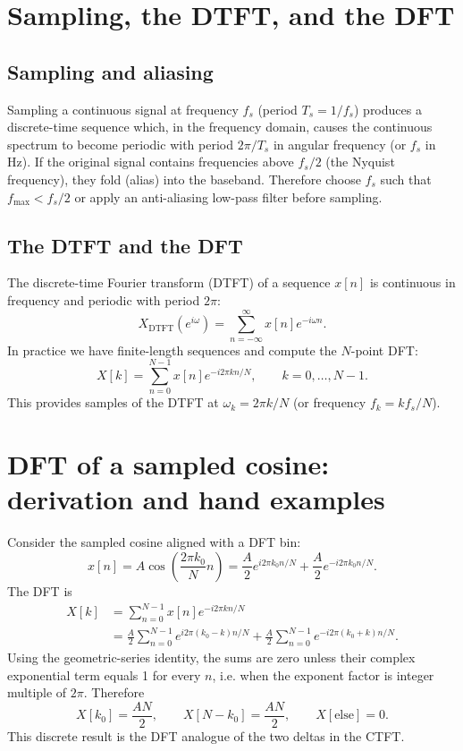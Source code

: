 \documentclass[a4paper]{article}
\begin{document}
\section{Sampling, the DTFT, and the DFT}
\subsection{Sampling and aliasing}
Sampling a continuous signal at frequency $f_s$ (period $T_s=1/f_s$) produces a discrete-time sequence which, in the frequency domain, causes the continuous spectrum to become periodic with period $2\pi/T_s$ in angular frequency (or $f_s$ in Hz). If the original signal contains frequencies above $f_s/2$ (the Nyquist frequency), they fold (alias) into the baseband. Therefore choose $f_s$ such that $f_{\max}<f_s/2$ or apply an anti-aliasing low-pass filter before sampling.

\subsection{The DTFT and the DFT}
The discrete-time Fourier transform (DTFT) of a sequence $x[n]$ is continuous in frequency and periodic with period $2\pi$:
\begin{equation}
X_{\mathrm{DTFT}}(e^{i\omega})=\sum_{n=-\infty}^{\infty} x[n] e^{-i\omega n}.
\end{equation}
In practice we have finite-length sequences and compute the $N$-point DFT:
\begin{equation}
X[k]=\sum_{n=0}^{N-1} x[n] e^{-i2\pi kn/N},\qquad k=0,\dots,N-1.
\end{equation}
This provides samples of the DTFT at $\omega_k=2\pi k/N$ (or frequency $f_k=k f_s/N$).

\section{DFT of a sampled cosine: derivation and hand examples}
Consider the sampled cosine aligned with a DFT bin:
\begin{equation}
x[n]=A\cos\left(\frac{2\pi k_0}{N}n\right)=\frac{A}{2}e^{i2\pi k_0 n/N}+\frac{A}{2}e^{-i2\pi k_0 n/N}.
\end{equation}
The DFT is
\begin{align}
X[k] &= \sum_{n=0}^{N-1} x[n] e^{-i2\pi k n/N} \\
&=\frac{A}{2}\sum_{n=0}^{N-1} e^{i2\pi (k_0-k)n/N} + \frac{A}{2}\sum_{n=0}^{N-1} e^{-i2\pi (k_0+k)n/N}.
\end{align}
Using the geometric-series identity, the sums are zero unless their complex exponential term equals 1 for every $n$, i.e. when the exponent factor is integer multiple of $2\pi$. Therefore
\begin{equation}
X[k_0]=\frac{AN}{2},\qquad X[N-k_0]=\frac{AN}{2},\qquad X[\text{else}]=0.
\end{equation}
This discrete result is the DFT analogue of the two deltas in the CTFT.
\end{document}
